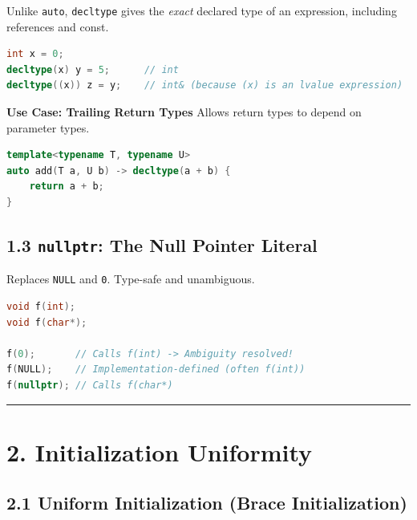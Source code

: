 Unlike \passthrough{\lstinline!auto!},
\passthrough{\lstinline!decltype!} gives the \emph{exact} declared type
of an expression, including references and const.

\begin{lstlisting}[language={C++}]
int x = 0;
decltype(x) y = 5;      // int
decltype((x)) z = y;    // int& (because (x) is an lvalue expression)
\end{lstlisting}

\textbf{Use Case: Trailing Return Types} Allows return types to depend
on parameter types.

\begin{lstlisting}[language={C++}]
template<typename T, typename U>
auto add(T a, U b) -> decltype(a + b) {
    return a + b;
}
\end{lstlisting}

\hypertarget{nullptr-the-null-pointer-literal}{%
\subsection{\texorpdfstring{1.3 \texttt{nullptr}: The Null Pointer
Literal}{1.3 nullptr: The Null Pointer Literal}}\label{nullptr-the-null-pointer-literal}}

Replaces \passthrough{\lstinline!NULL!} and \passthrough{\lstinline!0!}.
Type-safe and unambiguous.

\begin{lstlisting}[language={C++}]
void f(int);
void f(char*);

f(0);       // Calls f(int) -> Ambiguity resolved!
f(NULL);    // Implementation-defined (often f(int))
f(nullptr); // Calls f(char*)
\end{lstlisting}

\begin{center}\rule{0.5\linewidth}{0.5pt}\end{center}

\hypertarget{initialization-uniformity}{%
\section{2. Initialization Uniformity}\label{initialization-uniformity}}

\hypertarget{uniform-initialization-brace-initialization}{%
\subsection{2.1 Uniform Initialization (Brace
Initialization)}\label{uniform-initialization-brace-initialization}}

